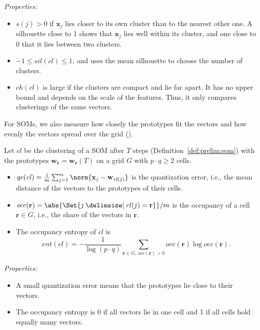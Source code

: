 \noindent\emph{Properties:}
\begin{itemize}[beginpenalty=10000]
	\item $s(j) > 0$ if $\mathbf{x}_j$ lies closer to its own cluster than to the nearest other one. A silhouette close to 1 shows that $\mathbf{x}_j$ lies well within its cluster, and one close to 0 that it lies between two clusters.
	\item $-1 \le \mathit{sil}(\mathit{cl}) \le 1$, and \textcite{rousseeuw1987silhouettes} uses the mean silhouette to choose the number of clusters.
	\item $\mathit{ch}(\mathit{cl})$ is large if the clusters are compact and lie far apart. It has no upper bound and depends on the scale of the features. Thus, it only compares clusterings of the same vectors.
\end{itemize}

For SOMs, we also measure how closely the prototypes fit the vectors and how evenly the vectors spread over the grid (\textcite{berti2025ocel}).

\begin{definition}
	\label{def:prelim:som_eval}
	Let $\mathit{cl}$ be the clustering of a SOM after $T$ steps (Definition~\ref{def:prelim:som}) with the prototypes $\mathbf{w}_{\mathbf{r}} = \mathbf{w}_{\mathbf{r}}(T)$ on a grid $G$ with $p \cdot q \ge 2$ cells.
	\begin{itemize}
		\item $\mathit{qe}(\mathit{cl}) = \frac{1}{m} \sum_{j=1}^{m} \norm{\mathbf{x}_j - \mathbf{w}_{\mathit{cl}(j)}}$ is the quantization error, i.e., the mean distance of the vectors to the prototypes of their cells.
		\item $\mathit{occ}(\mathbf{r}) = \abs{\Set{j \given \mathit{cl}(j) = \mathbf{r}}} / m$ is the occupancy of a cell $\mathbf{r} \in G$, i.e., the share of the vectors in $\mathbf{r}$.
		\item The occupancy entropy of $\mathit{cl}$ is
		      \[
			      \mathit{ent}(\mathit{cl}) = -\frac{1}{\log(p \cdot q)} \sum_{\mathbf{r} \in G,\, \mathit{occ}(\mathbf{r}) > 0} \mathit{occ}(\mathbf{r}) \log \mathit{occ}(\mathbf{r}).
		      \]
	\end{itemize}
\end{definition}

\noindent\emph{Properties:}
\begin{itemize}[beginpenalty=10000]
	\item A small quantization error means that the prototypes lie close to their vectors.
	\item The occupancy entropy is 0 if all vectors lie in one cell and 1 if all cells hold equally many vectors.
\end{itemize}

